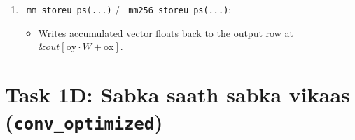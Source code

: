 \documentclass[11pt,a4paper]{article}
\begin{document}
\begin{enumerate}
\begin{itemize}
    \end{itemize}
    \item \texttt{\_mm\_storeu\_ps(...)} / \texttt{\_mm256\_storeu\_ps(...)}:
    \begin{itemize}
        \item Writes accumulated vector floats back to the output row at $\&out[\text{oy} \cdot W + \text{ox}]$.
    \end{itemize}
\end{enumerate}

\section{Task 1D: Sabka saath sabka vikaas (\texttt{conv\_optimized})}

\end{document}

